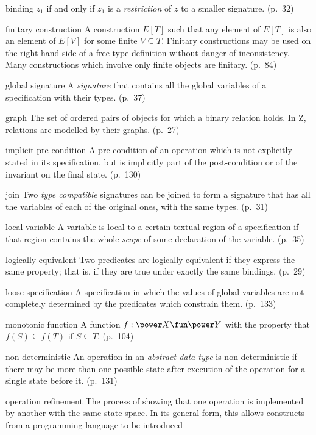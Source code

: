 \begin{theglossary}
  binding $z_1$ if and only if $z_1$ is a {\em restriction\/} of $z$ to
  a smaller signature. (p.~32)
\item[finitary construction] A construction $E[T]$ such that any element
  of $E[T]$ is also an element of $E[V]$ for some finite $V \subseteq
  T$. Finitary constructions may be used on the right-hand side of a
  free type definition without danger of inconsistency. Many
  constructions which involve only finite objects are finitary. (p.~84)
\item[global signature] A {\em signature\/} that contains all the global
  variables of a specification with their types. (p.~37)
\item[graph] The set of ordered pairs of objects for which a binary
  relation holds. In Z, relations are modelled by their graphs. (p.~27)
\item[implicit pre-condition] A pre-condition of an operation which is
  not explicitly stated in its specification, but is implicitly part of
  the post-condition or of the invariant on the final state. (p.~130)
\item[join] Two {\em type compatible\/} signatures can be joined to form
  a signature that has all the variables of each of the original ones,
  with the same types. (p.~31)
\item[local variable] A variable is local to a certain textual region of
  a specification if that region contains the whole {\em scope\/} of
  some declaration of the variable. (p.~35)
\item[logically equivalent] Two predicates are logically equivalent if
  they express the same property; that is, if they are true under
  exactly the same bindings. (p.~29)
\item[loose specification] A specification in which the values of global
  variables are not completely determined by the predicates which
  constrain them. (p.~133)
\item[monotonic function] A function $f: \power X \fun \power Y$ with
  the property that $f(S) \subseteq f(T)$ if $S \subseteq T$. (p.~104)
\item[non-deterministic] An operation in an {\em abstract data type\/}
  is non-deterministic if there may be more than one possible state
  after execution of the operation for a single state before it.
  (p.~131)
\item[operation refinement] The process of showing that one operation is
  implemented by another with the same state space. In its general form,
  this allows constructs from a programming language to be introduced

\end{theglossary}
